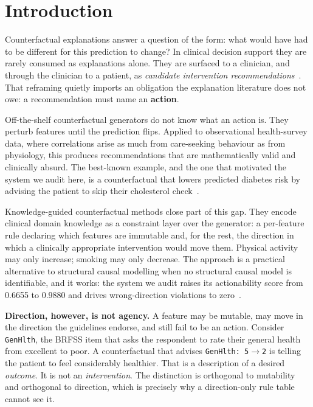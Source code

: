 \documentclass[conference]{IEEEtran}
\begin{document}
\section{Introduction}
Counterfactual explanations answer a question of the form: what would have had to be different for this prediction to change? In clinical decision support they are rarely consumed as explanations alone. They are surfaced to a clinician, and through the clinician to a patient, as \emph{candidate intervention recommendations}~\cite{thieu2026}. That reframing quietly imports an obligation the explanation literature does not owe: a recommendation must name an \textbf{action}.

Off-the-shelf counterfactual generators do not know what an action is. They perturb features until the prediction flips. Applied to observational health-survey data, where correlations arise as much from care-seeking behaviour as from physiology, this produces recommendations that are mathematically valid and clinically absurd. The best-known example, and the one that motivated the system we audit here, is a counterfactual that lowers predicted diabetes risk by advising the patient to skip their cholesterol check~\cite{thieu2026}.

Knowledge-guided counterfactual methods close part of this gap. They encode clinical domain knowledge as a constraint layer over the generator: a per-feature rule declaring which features are immutable and, for the rest, the direction in which a clinically appropriate intervention would move them. Physical activity may only increase; smoking may only decrease. The approach is a practical alternative to structural causal modelling when no structural causal model is identifiable, and it works: the system we audit raises its actionability score from 0.6655 to 0.9880 and drives wrong-direction violations to zero~\cite{thieu2026}.

\textbf{Direction, however, is not agency.} A feature may be mutable, may move in the direction the guidelines endorse, and still fail to be an action. Consider \texttt{GenHlth}, the BRFSS item that asks the respondent to rate their general health from excellent to poor. A counterfactual that advises \texttt{GenHlth: 5}$\rightarrow$\texttt{2} is telling the patient to feel considerably healthier. That is a description of a desired \emph{outcome}. It is not an \emph{intervention}. The distinction is orthogonal to mutability and orthogonal to direction, which is precisely why a direction-only rule table cannot see it.
\end{document}
